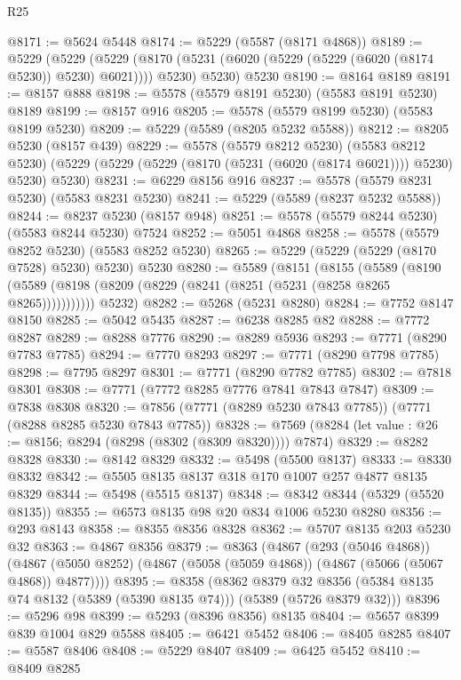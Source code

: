 \begin{lexlean}{R25}
\begin{coremodule}
@8171 := @5624 @5448
@8174 := @5229 (@5587 (@8171 @4868))
@8189 := @5229
    (@5229
      (@5229 (@8170 (@5231 (@6020 (@5229 (@5229 (@6020 (@8174 @5230)) @5230) @6021)))) @5230)
      @5230)
    @5230
@8190 := @8164 @8189
@8191 := @8157 @888
@8198 := @5578 (@5579 @8191 @5230) (@5583 @8191 @5230) @8189
@8199 := @8157 @916
@8205 := @5578 (@5579 @8199 @5230) (@5583 @8199 @5230)
@8209 := @5229 (@5589 (@8205 @5232 @5588))
@8212 := @8205 @5230 (@8157 @439)
@8229 := @5578
    (@5579 @8212 @5230)
    (@5583 @8212 @5230)
    (@5229 (@5229 (@5229 (@8170 (@5231 (@6020 (@8174 @6021)))) @5230) @5230) @5230)
@8231 := @6229 @8156 @916
@8237 := @5578 (@5579 @8231 @5230) (@5583 @8231 @5230)
@8241 := @5229 (@5589 (@8237 @5232 @5588))
@8244 := @8237 @5230 (@8157 @948)
@8251 := @5578 (@5579 @8244 @5230) (@5583 @8244 @5230) @7524
@8252 := @5051 @4868
@8258 := @5578 (@5579 @8252 @5230) (@5583 @8252 @5230)
@8265 := @5229 (@5229 (@5229 (@8170 @7528) @5230) @5230) @5230
@8280 := @5589
    (@8151
      (@8155
        (@5589 (@8190 (@5589 (@8198 (@8209 (@8229 (@8241 (@8251 (@5231 (@8258 @8265 @8265)))))))))))
      @5232)
@8282 := @5268 (@5231 @8280)
@8284 := @7752 @8147 @8150
@8285 := @5042 @5435
@8287 := @6238 @8285 @82
@8288 := @7772 @8287
@8289 := @8288 @7776
@8290 := @8289 @5936
@8293 := @7771 (@8290 @7783 @7785)
@8294 := @7770 @8293
@8297 := @7771 (@8290 @7798 @7785)
@8298 := @7795 @8297
@8301 := @7771 (@8290 @7782 @7785)
@8302 := @7818 @8301
@8308 := @7771 (@7772 @8285 @7776 @7841 @7843 @7847)
@8309 := @7838 @8308
@8320 := @7856 (@7771 (@8289 @5230 @7843 @7785)) (@7771 (@8288 @8285 @5230 @7843 @7785))
@8328 := @7569 (@8284 (let value : @26 := @8156; @8294 (@8298 (@8302 (@8309 @8320)))) @7874)
@8329 := @8282 @8328
@8330 := @8142 @8329
@8332 := @5498 (@5500 @8137)
@8333 := @8330 @8332
@8342 := @5505 @8135 @8137 @318 @170 @1007 @257 @4877 @8135 @8329
@8344 := @5498 (@5515 @8137)
@8348 := @8342 @8344 (@5329 (@5520 @8135))
@8355 := @6573 @8135 @98 @20 @834 @1006 @5230 @8280
@8356 := @293 @8143
@8358 := @8355 @8356 @8328
@8362 := @5707 @8135 @203 @5230 @32
@8363 := @4867 @8356
@8379 := @8363
    (@4867
      (@293 (@5046 @4868))
      (@4867 (@5050 @8252) (@4867 (@5058 (@5059 @4868)) (@4867 (@5066 (@5067 @4868)) @4877))))
@8395 := @8358
    (@8362
      @8379
      @32
      @8356
      (@5384 @8135 @74 @8132 (@5389 (@5390 @8135 @74)))
      (@5389 (@5726 @8379 @32)))
@8396 := @5296 @98
@8399 := @5293 (@8396 @8356) @8135
@8404 := @5657 @8399 @839 @1004 @829 @5588
@8405 := @6421 @5452
@8406 := @8405 @8285
@8407 := @5587 @8406
@8408 := @5229 @8407
@8409 := @6425 @5452
@8410 := @8409 @8285

\end{coremodule}
\end{lexlean}
